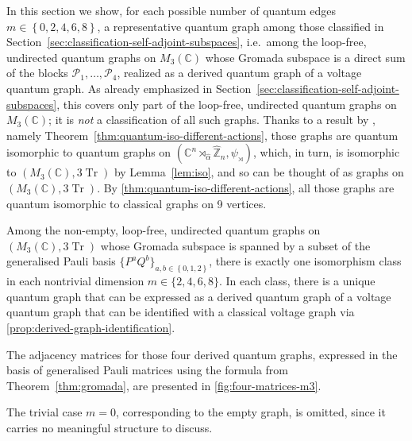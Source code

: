 In this section we show, for each possible number of quantum edges
\( m \in \left\{ 0, 2, 4, 6, 8 \right\} \), a representative quantum
graph among those classified in
Section~\ref{sec:classification-self-adjoint-subspaces}, i.e.\
among the loop-free, undirected quantum graphs on \( M_{3}(\mathbb{C}) \) whose
Gromada subspace is a direct sum of the blocks
\( \mathcal{P}_1,\ldots,\mathcal{P}_4 \), realized as a derived
quantum graph of a voltage quantum graph. As already emphasized in
Section~\ref{sec:classification-self-adjoint-subspaces}, this
covers only part of the loop-free, undirected quantum graphs on
\( M_{3}(\mathbb{C}) \); it is \emph{not} a classification of all such graphs.
Thanks to a result by \textcite{tobolski26}, namely
Theorem~\ref{thm:quantum-iso-different-actions}, those graphs are
quantum isomorphic to quantum
graphs on \( (\mathbb{C}^n \rtimes_{\hat\alpha} \hat{\mathbb{Z}}_n,
\psi_\rtimes) \), which, in turn, is isomorphic to \( (M_{3}(\mathbb{C}), 3
\operatorname{Tr}) \) by Lemma~\ref{lem:iso}, and so can be thought of as graphs
on \( (M_{3}(\mathbb{C}), 3\operatorname{Tr}) \). By
\ref{thm:quantum-iso-different-actions}, all those graphs are quantum
isomorphic to classical graphs on 9 vertices.

\begin{theorem}
    \label{thm:4matrices}
    Among the non-empty, loop-free, undirected quantum graphs on
    \( (M_{3}(\mathbb{C}), 3\operatorname{Tr}) \) whose Gromada
    subspace is spanned by a subset of the generalised Pauli basis
    \( \{P^aQ^b\}_{a,b\in \left\{ 0,1,2 \right\}} \), there is
    exactly one isomorphism class in each nontrivial dimension \( m
    \in \{2,4,6,8\} \). In each class, there is a unique quantum
    graph that can be expressed as a derived quantum graph of a
    voltage quantum graph that can be identified with a classical
    voltage graph via \ref{prop:derived-graph-identification}.

    The adjacency matrices for those four derived quantum graphs,
    expressed in the basis of generalised Pauli matrices using the
    formula from Theorem~\ref{thm:gromada}, are
    presented in \ref{fig:four-matrices-m3}.
    
\end{theorem}

The trivial case \( m=0 \), corresponding to the empty graph, is
omitted, since it carries no meaningful structure to discuss.

